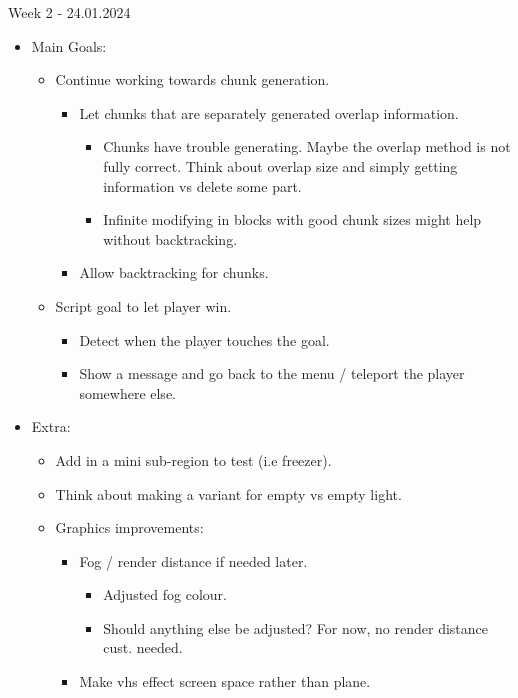 \noindent Week 2 - 24.01.2024
\begin{itemize}
    \item Main Goals:
    \begin{itemize}
        \item Continue working towards chunk generation.
        \begin{itemize}
            \item Let chunks that are separately generated overlap information.
            \begin{itemize}
                \item Chunks have trouble generating. Maybe the overlap method is not fully correct. Think about overlap size and simply getting information vs delete some part.
                \item Infinite modifying in blocks with good chunk sizes might help without backtracking.
            \end{itemize}
            \item Allow backtracking for chunks.
        \end{itemize}
        \item Script goal to let player win.
        \begin{itemize}
            \item Detect when the player touches the goal.
            \item Show a message and go back to the menu / teleport the player somewhere else.
        \end{itemize}
    \end{itemize}
    \item Extra:
    \begin{itemize}
        \item Add in a mini sub-region to test (i.e freezer).
        \item Think about making a variant for empty vs empty light.
        \item Graphics improvements:
        \begin{itemize}
            \item Fog / render distance if needed later.
            \begin{itemize}
                \item Adjusted fog colour.
                \item Should anything else be adjusted? For now, no render distance cust. needed.
            \end{itemize}
            \item Make vhs effect screen space rather than plane.

\end{itemize}
\end{itemize}
\end{itemize}
